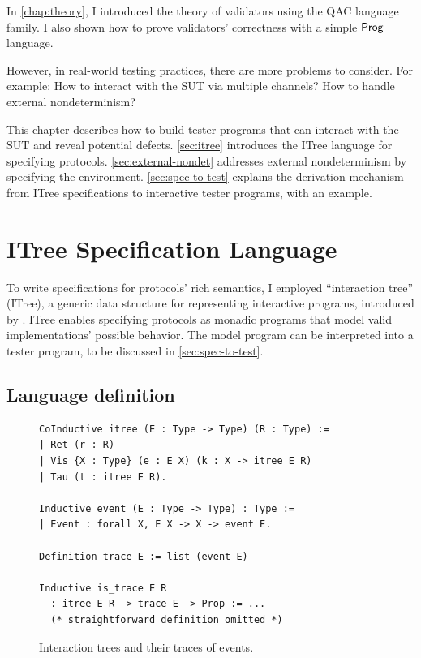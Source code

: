 In \autoref{chap:theory}, I introduced the theory of validators using the QAC
language family.  I also shown how to prove validators' correctness with a
simple $\mathsf{Prog}$ language.

However, in real-world testing practices, there are more problems to consider.
For example: How to interact with the SUT via multiple channels?  How to handle
external nondeterminism?

This chapter describes how to build tester programs that can interact with the
SUT and reveal potential defects.  \autoref{sec:itree} introduces the ITree
language for specifying protocols.  \autoref{sec:external-nondet} addresses
external nondeterminism by specifying the environment.
\autoref{sec:spec-to-test} explains the derivation mechanism from ITree
specifications to interactive tester programs, with an \http example.

\section{ITree Specification Language}
\label{sec:itree}
To write specifications for protocols' rich semantics, I employed ``interaction
tree'' (ITree), a generic data structure for representing interactive programs,
introduced by \textcite{itree}.  ITree enables specifying protocols as monadic
programs that model valid implementations' possible behavior.  The model program
can be interpreted into a tester program, to be discussed in
\autoref{sec:spec-to-test}.

\subsection{Language definition}

\begin{figure}
  \begin{lstlisting}[style=customcoq]
CoInductive itree (E : Type -> Type) (R : Type) :=
| Ret (r : R)
| Vis {X : Type} (e : E X) (k : X -> itree E R)
| Tau (t : itree E R).

Inductive event (E : Type -> Type) : Type :=
| Event : forall X, E X -> X -> event E.

Definition trace E := list (event E)

Inductive is_trace E R
  : itree E R -> trace E -> Prop := ...
  (* straightforward definition omitted *)
 \end{lstlisting}
  \caption{Interaction trees and their traces of events.}
  \label{fig:itrees}
\end{figure}

